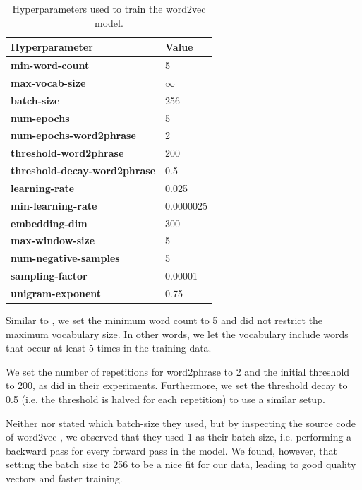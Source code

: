 \begin{table}[ht]
    \centering
    \begin{tabular}{@{}ll@{}}
    \toprule
    Hyperparameter & Value\\
    \midrule
    \trcolor \textbf{min-word-count} & 5\\
    \textbf{max-vocab-size} & $\infty$ \\
    \trcolor \textbf{batch-size} & 256\\
    \textbf{num-epochs} & 5\\
    \trcolor \textbf{num-epochs-word2phrase} & 2\\
    \textbf{threshold-word2phrase} & 200\\
    \trcolor \textbf{threshold-decay-word2phrase} & 0.5\\
    \textbf{learning-rate} & 0.025\\
    \trcolor \textbf{min-learning-rate} & 0.0000025\\
    \textbf{embedding-dim} & 300\\
    \trcolor \textbf{max-window-size} & 5\\
    \textbf{num-negative-samples} & 5\\
    \trcolor \textbf{sampling-factor} & 0.00001\\
    \textbf{unigram-exponent} & 0.75\\
    \bottomrule
    \end{tabular}
    \caption{Hyperparameters used to train the word2vec model.}
    \label{table:word2vec-hyperparameter-choices}
\end{table}

Similar to \cite{mikolov2013b}, we set the minimum word count to 5 and did not restrict the maximum vocabulary size. In other words, we let the vocabulary include words that occur at least 5 times in the training data.

We set the number of repetitions for word2phrase to 2 and the initial threshold to 200, as \cite{mikolov2013b} did in their experiments. Furthermore, we set the threshold decay to 0.5 (i.e. the threshold is halved for each repetition) to use a similar setup.

Neither \cite{mikolov2013a} nor \cite{mikolov2013b} stated which batch-size they used, but by inspecting the source code of word2vec \cite[line 542]{Word2vecCCode}, we observed that they used 1 as their batch size, i.e. performing a backward pass for every forward pass in the model. We found, however, that setting the batch size to 256 to be a nice fit for our data, leading to good quality vectors and faster training.

